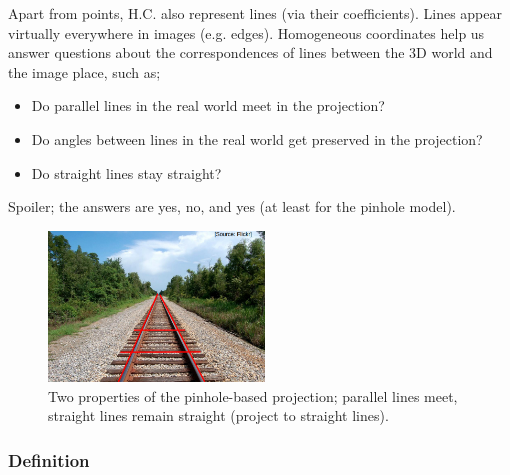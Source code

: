 \documentclass[a4paper]{article}
\begin{document}
Apart from points, H.C. also represent lines (via their coefficients). Lines appear virtually everywhere in images (e.g. edges). Homogeneous coordinates help us answer questions about the correspondences of lines between the 3D world and the image place, such as; 
\begin{itemize}
    \item Do parallel lines in the real world meet in the projection?
    \item Do angles between lines in the real world get preserved in the projection?
    \item Do straight lines stay straight?
\end{itemize}
Spoiler; the answers are yes, no, and yes (at least for the pinhole model).
\begin{figure}[H]
    \centering
    \includegraphics[height=4cm]{img/railway_tracks.png}
    \caption{Two properties of the pinhole-based projection; parallel lines meet, straight lines remain straight (project to straight lines).}
    \label{fig:my_label}
\end{figure}

\subsubsection{Definition}
\end{document}
